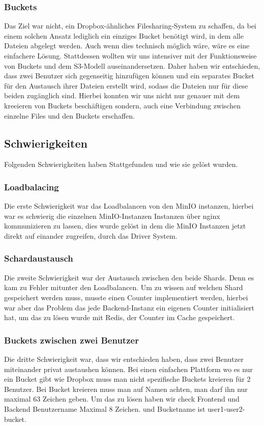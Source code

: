\documentclass[12pt]{report}
\begin{document}
			\subsubsection{Buckets}
				Das Ziel war nicht, ein Dropbox-ähnliches Filesharing-System zu schaffen, da bei einem solchen Ansatz lediglich ein einziges Bucket benötigt wird, in dem alle Dateien abgelegt werden. Auch wenn dies technisch möglich wäre, wäre es eine einfachere Lösung. Stattdessen wollten wir uns intensiver mit der Funktionsweise von Buckets und dem S3-Modell auseinandersetzen. Daher haben wir entschieden, dass zwei Benutzer sich gegenseitig hinzufügen können und ein separates Bucket für den Austausch ihrer Dateien erstellt wird, sodass die Dateien nur für diese beiden zugänglich sind. Hierbei konnten wir uns nicht nur genauer mit dem kreeieren von Buckets beschäftigen sondern, auch eine Verbindung zwischen einzelne Files und den Buckets erschaffen.
			\subsection{Schwierigkeiten}
				Folgenden Schwierigkeiten haben Stattgefunden und wie sie gelöst wurden.
				
				\subsubsection{Loadbalacing}
					Die erste Schwierigkeit war das Loadbalancen von den MinIO instanzen, hierbei war es schwierig die einzelnen MinIO-Instanzen Instanzen über nginx kommunizieren zu lassen, dies wurde gelöst in dem die MinIO Instanzen jetzt direkt auf einander zugreifen, durch das Driver System.
			
				\subsubsection{Schardaustausch}
					Die zweite Schwierigkeit war der Austausch zwischen den beide Shards. Denn es kam zu Fehler mitunter den Loadbalancen. Um zu wissen auf welchen Shard gespeichert werden muss, musste einen Counter implementiert werden, hierbei war aber das Problem das jede Backend-Instanz ein eigenen Counter initialisiert hat, um das zu lösen wurde mit Redis, der Counter im Cache gespeichert.
				
				\subsubsection{Buckets zwischen zwei Benutzer}
					Die dritte Schwierigkeit war, dass wir entschieden haben, dass zwei Benutzer miteinander privat austaushen können. Bei einen einfachen Plattform wo es nur ein Bucket gibt wie Dropbox muss man nicht spezifische Buckets kreieren für 2 Benutzer. Bei Bucket kreieren muss man auf Namen achten, man darf ihn nur maximal 63 Zeichen geben. Um das zu lösen haben wir check Frontend und Backend Benutzername Maximal 8 Zeichen. und Bucketname ist user1-user2-bucket.
			
\end{document}
